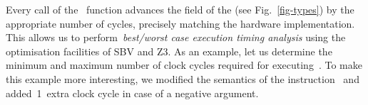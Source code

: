 



Every call of the~ function advances the  field
of the  (see Fig.~\ref{fig-types}) by the appropriate number of
cycles, precisely matching the hardware implementation. This allows us to
perform~\emph{best/worst case execution timing analysis} using the
optimisation facilities of SBV and Z3. As an example,
let us determine the minimum and maximum number of clock cycles required for
executing~. To make this example more
interesting, we modified the semantics of the instruction~ and
added~1~extra clock cycle in case of a negative argument.


